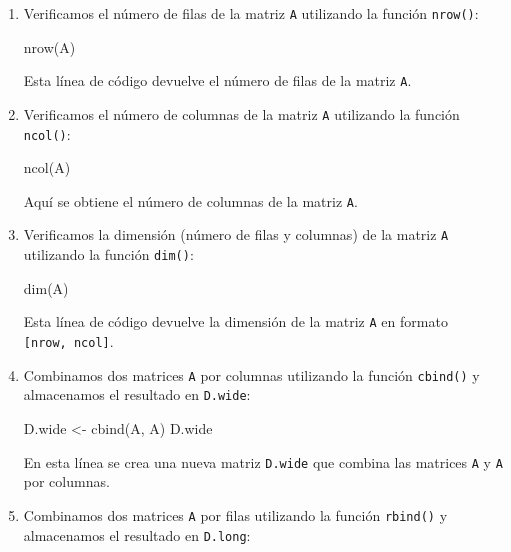 \documentclass[
  jou,
  floatsintext,
  longtable,
  a4paper,
  nolmodern,
  notxfonts,
  notimes,
  colorlinks=true,linkcolor=blue,citecolor=blue,urlcolor=blue]{apa7}
\newenvironment{Shaded}{\begin{snugshade}}{\end{snugshade}}
\newcommand{\FunctionTok}[1]{\textcolor[rgb]{0.28,0.35,0.67}{#1}}
\newcommand{\NormalTok}[1]{\textcolor[rgb]{0.00,0.23,0.31}{#1}}
\newcommand{\OtherTok}[1]{\textcolor[rgb]{0.00,0.23,0.31}{#1}}
\begin{document}
\begin{enumerate}
\def\labelenumi{\arabic{enumi}.}
\item
  Verificamos el número de filas de la matriz \texttt{A} utilizando la
  función \texttt{nrow()}:

\begin{Shaded}
\begin{Highlighting}[]
\FunctionTok{nrow}\NormalTok{(A)}
\end{Highlighting}
\end{Shaded}

  Esta línea de código devuelve el número de filas de la matriz
  \texttt{A}.
\item
  Verificamos el número de columnas de la matriz \texttt{A} utilizando
  la función \texttt{ncol()}:

\begin{Shaded}
\begin{Highlighting}[]
\FunctionTok{ncol}\NormalTok{(A)}
\end{Highlighting}
\end{Shaded}

  Aquí se obtiene el número de columnas de la matriz \texttt{A}.
\item
  Verificamos la dimensión (número de filas y columnas) de la matriz
  \texttt{A} utilizando la función \texttt{dim()}:

\begin{Shaded}
\begin{Highlighting}[]
\FunctionTok{dim}\NormalTok{(A)}
\end{Highlighting}
\end{Shaded}

  Esta línea de código devuelve la dimensión de la matriz \texttt{A} en
  formato \texttt{{[}nrow,\ ncol{]}}.
\item
  Combinamos dos matrices \texttt{A} por columnas utilizando la función
  \texttt{cbind()} y almacenamos el resultado en \texttt{D.wide}:

\begin{Shaded}
\begin{Highlighting}[]
\NormalTok{D.wide }\OtherTok{\textless{}{-}} \FunctionTok{cbind}\NormalTok{(A, A)}
\NormalTok{D.wide}
\end{Highlighting}
\end{Shaded}

  En esta línea se crea una nueva matriz \texttt{D.wide} que combina las
  matrices \texttt{A} y \texttt{A} por columnas.
\item
  Combinamos dos matrices \texttt{A} por filas utilizando la función
  \texttt{rbind()} y almacenamos el resultado en \texttt{D.long}:


\end{enumerate}
\end{document}
